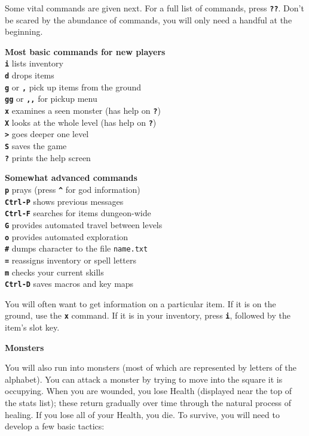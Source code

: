 \documentclass[a4paper,10pt]{article}
\newcommand{\key}[1]{{{\texttt{\textbf{#1}}}}} %
\newcommand{\sex}[1]{{{\textbf{#1}}}} %
\newcommand{\spacecolumn}{\begin{minipage}[t]{2cm}\phantom{xxxx}\end{minipage}}
\newcommand{\para}{\vspace{1.5ex}}
\begin{document}
\para

Some vital commands are given next. For a full list of commands, press \key{??}.
Don't be scared by the abundance of commands, you will only need a handful at 
the beginning. 

\para

\begin{minipage}[t]{7cm}
\sex{Most basic commands for new players} \\
\key{i} lists inventory \\
\key{d}	drops items \\
\key{g} or \key{,} pick up items from the ground \\
\key{gg} or \key{,,} for pickup menu \\
\key{x} examines a seen monster (has help on \key{?}) \\
\key{X} looks at the whole level (has help on \key{?}) \\
\key{>} goes deeper one level \\
\key{S} saves the game \\
\key{?} prints the help screen
\end{minipage}
%
\spacecolumn
%
\begin{minipage}[t]{7cm}
\sex{Somewhat advanced commands} \\
\key{p} prays (press \key{\^} for god information) \\
\key{Ctrl-P} shows previous messages \\
\key{Ctrl-F} searches for items dungeon-wide \\
\key{G} provides automated travel between levels \\
\key{o} provides automated exploration \\
\key{\#} dumps character to the file \texttt{name.txt} \\
\key{=} reassigns inventory or spell letters \\
\key{m} checks your current skills \\ 
\key{Ctrl-D} saves macros and key maps
\end{minipage}

\para

You will often want to get information on a particular item. If it is on the
ground, use the \key{x} command. If it is in your inventory, press \key{i},
followed by the item's slot key.

\para\para

\sex{Monsters} \para 

You will also run into monsters (most of which are represented by letters of 
the alphabet). You can attack a monster by trying to move into the square it 
is occupying. 
When you are wounded, you lose Health (displayed near the top of the stats 
list); these return gradually over time through the natural process of 
healing. If you lose all of your Health, you die. 
To survive, you will need to develop a few basic tactics: \\
\end{document}
